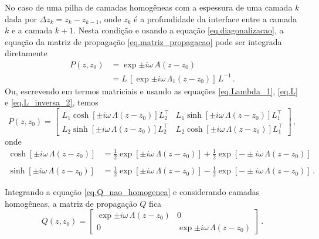 No caso de uma pilha de camadas homog\^eneas com a espessura de uma camada $k$ dada por $\Delta z_k=z_k-z_{k-1}$, onde $z_k$ \'e a profundidade da interface entre a camada $k$ e a camada $k+1$. Nesta condi\c{c}\~ao e usando a equa\c{c}\~ao \ref{eq.diagonalizacao}, a equa\c{c}\~ao da matriz de propaga\c{c}\~ao \ref{eq.matriz_propagacao} pode ser integrada diretamente  
\begin{align*}
P(z,z_0)&=\exp{\pm i\omega\,A(z-z_0)}\\
&=L\,\left[\exp{\pm i\omega\,\Lambda_1(z-z_0)}\right]\,L^{-1}\,.
\end{align*}
Ou, escrevendo em termos matriciais e usando as equa\c{c}\~oes \ref{eq.Lambda_1}, \ref{eq.L} e \ref{eq.L_inversa_2}, temos
\begin{equation*}
P(z,z_0)=
\begin{bmatrix}
L_1\cosh[\pm i\omega\,\Lambda(z-z_0)]L^\top_2&L_1\sinh[\pm i\omega\,\Lambda(z-z_0)]L^\top_1\\
L_2\sinh[\pm i\omega\,\Lambda(z-z_0)]L^\top_2&L_2\cosh[\pm i\omega\,\Lambda(z-z_0)]L^\top_1
\end{bmatrix}\,,
\end{equation*}
onde
\begin{align*}
\cosh[\pm i\omega\,\Lambda(z-z_0)]&=\frac{1}{2}\exp\left[\pm i\omega\,\Lambda(z-z_0)\right]+\frac{1}{2}\exp\left[-\pm i\omega\,\Lambda(z-z_0)\right]\\\quad\\
\sinh[\pm i\omega\,\Lambda(z-z_0)]&=\frac{1}{2}\exp\left[\pm i\omega\,\Lambda(z-z_0)\right]-\frac{1}{2}\exp\left[-\pm i\omega\,\Lambda(z-z_0)\right]\,.
\end{align*}

Integrando a equa\c{c}\~ao \ref{eq.Q_nao_homogenea} e considerando camadas homog\^eneas, a matriz de propaga\c{c}\~ao $Q$ fica
\begin{equation}\label{eq.Q(z,z_0)}
Q(z,z_0)=
\begin{bmatrix}
\exp{\pm i\omega\,\Lambda(z-z_0)}&0\\
0&\exp{\pm i\omega\,\Lambda(z-z_0)}
\end{bmatrix}\,.
\end{equation}

